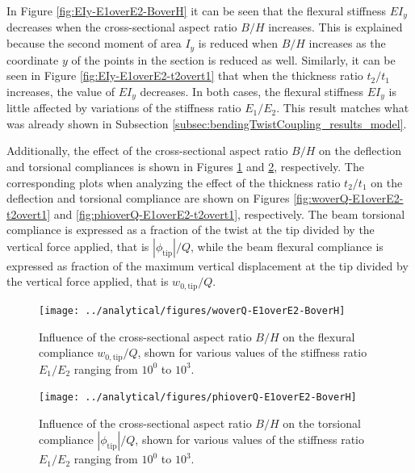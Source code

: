    In Figure \ref{fig:EIy-E1overE2-BoverH} it can be seen that the flexural stiffness $E I_y$ decreases when the cross-sectional aspect ratio $B/H$ increases. This is explained because the second moment of area $I_y$ is reduced when $B/H$ increases as the coordinate $y$ of the points in the section is reduced as well. Similarly, it can be seen in Figure \ref{fig:EIy-E1overE2-t2overt1} that when the thickness ratio $t_2/t_1$ increases, the value of $E I_y$ decreases. In both cases, the flexural stiffness $E I_y$ is little affected by variations of the stiffness ratio $E_1/E_2$. This result matches what was already shown in Subsection \ref{subsec:bendingTwistCoupling_results_model}.

    Additionally, the effect of the cross-sectional aspect ratio $B/H$ on the deflection and torsional compliances is shown in Figures \ref{fig:woverQ-E1overE2-BoverH} and \ref{fig:phioverQ-E1overE2-BoverH}, respectively. The corresponding plots when analyzing the effect of the thickness ratio $t_2/t_1$ on the deflection and torsional compliance are shown on Figures \ref{fig:woverQ-E1overE2-t2overt1} and \ref{fig:phioverQ-E1overE2-t2overt1}, respectively. The beam torsional compliance is expressed as a fraction of the twist at the tip divided by the vertical force applied, that is $|\phi_{\mathrm{tip}}| / Q$, while the beam flexural compliance is expressed as fraction of the maximum vertical displacement at the tip divided by the vertical force applied, that is $w_{\mathrm{0,tip}} / Q$.

    \begin{figure}[!htpb] %
      \centering
      \texttt{[image: ../analytical/figures/woverQ-E1overE2-BoverH]}
      \caption[Influence of the cross-sectional aspect ratio $B/H$ on the flexural compliance]{Influence of the cross-sectional aspect ratio $B/H$ on the flexural compliance $w_{\mathrm{0,tip}} / Q$, shown for various values of the stiffness ratio $E_1/E_2$ ranging from $10^0$ to $10^3$. }\label{fig:woverQ-E1overE2-BoverH}
    \end{figure}

    \begin{figure}[!htpb] %
      \centering
      \texttt{[image: ../analytical/figures/phioverQ-E1overE2-BoverH]}
      \caption[Influence of the cross-sectional aspect ratio $B/H$ on the torsional compliance]{Influence of the cross-sectional aspect ratio $B/H$ on the torsional compliance $|\phi_{\mathrm{tip}}| / Q$, shown for various values of the stiffness ratio $E_1/E_2$ ranging from $10^0$ to $10^3$. }\label{fig:phioverQ-E1overE2-BoverH}
    \end{figure}

